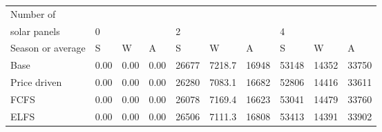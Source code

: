\begin{table}[h] 
\centering 
\begin{tabular}{l|lll|lll|lll}Number of \\ solar panels&0& & &2& & &4& & \\ \hline 
Season or average & S & W & A & S & W & A & S & W & A \\ \hline 
Base&0.00&0.00&0.00&26677&7218.7&16948&53148&14352&33750 \\ 
Price driven&0.00&0.00&0.00&26280&7083.1&16682&52806&14416&33611 \\ 
FCFS&0.00&0.00&0.00&26078&7169.4&16623&53041&14479&33760 \\ 
ELFS&0.00&0.00&0.00&26506&7111.3&16808&53413&14391&33902 \\ 
\end{tabular} 
\end{table}